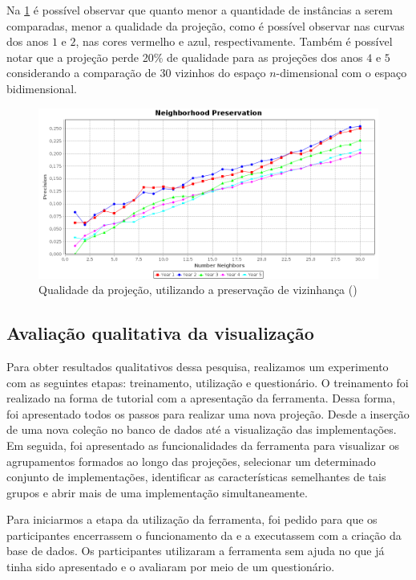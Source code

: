 	Na \ref{fig:neighborhoodAPOO30} é possível observar que quanto menor a quantidade de
	instâncias a serem comparadas, menor a qualidade da projeção, como é possível observar
	nas curvas dos anos $1$ e $2$, nas cores vermelho e azul, respectivamente. Também é
	possível notar que a projeção perde 20\% de qualidade para as projeções dos anos
	$4$ e $5$ considerando a comparação de $30$ vizinhos do espaço $n$-dimensional com
	o espaço bidimensional.
	
	
	\begin{figure}
		\centering
		\includegraphics[width=0.7\linewidth]{imagem/neighborhoodAPOO30}
		\caption{Qualidade da projeção, utilizando a preservação de vizinhança ()}
		\label{fig:neighborhoodAPOO30}
	\end{figure}
	
	
	\subsection{Avaliação qualitativa da visualização}
		Para obter resultados qualitativos dessa pesquisa, realizamos um experimento com
		as seguintes etapas: treinamento, utilização e questionário. O treinamento foi
		realizado na forma de tutorial com a apresentação da ferramenta. Dessa forma,
		foi apresentado todos os passos para realizar uma nova projeção. Desde a inserção
		de uma nova coleção no banco de dados até a visualização das implementações. Em
		seguida, foi apresentado as funcionalidades da ferramenta para visualizar os
		agrupamentos formados ao longo das projeções, selecionar um determinado conjunto
		de implementações, identificar as características semelhantes de tais grupos e
		abrir mais de uma implementação simultaneamente.
		
		Para iniciarmos a etapa da utilização da ferramenta, foi pedido para que os
		participantes encerrassem o funcionamento da  e a
		executassem com a criação da base de dados. Os participantes utilizaram a
		ferramenta sem ajuda no que já tinha sido apresentado e o avaliaram por meio
		de um questionário.
		
